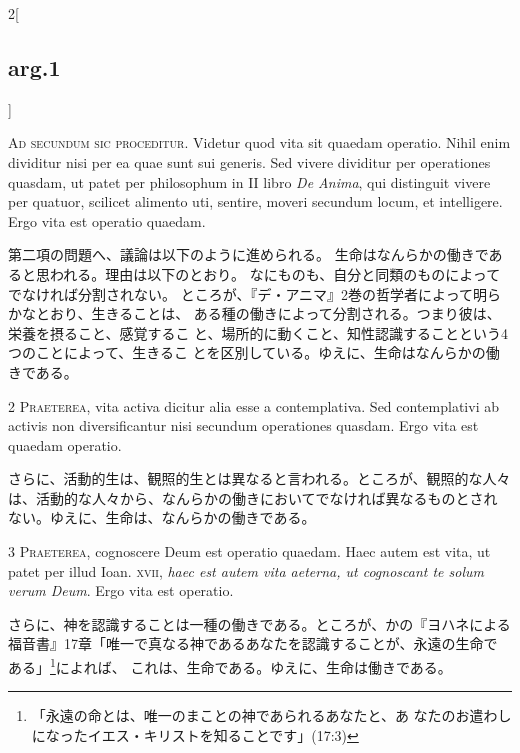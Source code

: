 \documentclass[paper=a4paper,fontsize=10pt,jafontsize=9pt,titlepage]{jlreq}
\begin{document}
\begin{paracol}{2}[\subsection{arg.1}]


{\huge A}{\scshape d secundum sic proceditur}. Videtur quod vita sit
 quaedam operatio. Nihil enim dividitur nisi per ea quae sunt sui
 generis. Sed vivere dividitur per operationes quasdam, ut patet per
 philosophum in II libro {\itshape De Anima}, qui distinguit vivere per quatuor,
 scilicet alimento uti, sentire, moveri secundum locum, et
 intelligere. Ergo vita est operatio quaedam.

\switchcolumn

第二項の問題へ、議論は以下のように進められる。
生命はなんらかの働きであると思われる。理由は以下のとおり。
なにものも、自分と同類のものによってでなければ分割されない。
ところが、『デ・アニマ』2巻の哲学者によって明らかなとおり、生きることは、
 ある種の働きによって分割される。つまり彼は、栄養を摂ること、感覚するこ
 と、場所的に動くこと、知性認識することという4つのことによって、生きるこ
 とを区別している。ゆえに、生命はなんらかの働きである。



{\scshape 2 Praeterea}, vita activa dicitur alia esse a
 contemplativa. Sed contemplativi ab activis non diversificantur nisi
 secundum operationes quasdam. Ergo vita est quaedam operatio.

\switchcolumn

さらに、活動的生は、観照的生とは異なると言われる。ところが、観照的な人々
 は、活動的な人々から、なんらかの働きにおいてでなければ異なるものとされ
 ない。ゆえに、生命は、なんらかの働きである。



{\scshape 3 Praeterea}, cognoscere Deum est operatio quaedam. Haec autem
 est vita, ut patet per illud Ioan. {\scshape xvii}, {\itshape haec est autem vita aeterna,
 ut cognoscant te solum verum Deum}. Ergo vita est operatio.

\switchcolumn

さらに、神を認識することは一種の働きである。ところが、かの『ヨハネによる
 福音書』17章「唯一で真なる神であるあなたを認識することが、永遠の生命で
 ある」\footnote{「永遠の命とは、唯一のまことの神であられるあなたと、あ
 なたのお遣わしになったイエス・キリストを知ることです」(17:3)}によれば、
 これは、生命である。ゆえに、生命は働きである。


\end{paracol}
\end{document}
